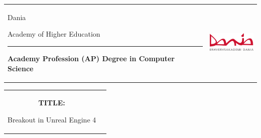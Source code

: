 \thispagestyle{empty}
\begin{titlepage}
\fontsize{11pt}{13pt}\selectfont
\begin{nopagebreak}
{\samepage 
\begin{tabular}{lr}
\parbox{14.5cm}{
  {\LARGE Dania}

  {\small Academy of Higher Education}
  \vspace{-0.3cm}\\
\hrule
\vspace{0.2cm}
  {\bf Academy Profession (AP) Degree in Computer Science}
 }   & \hspace{-2.8cm} {  \includegraphics[width=23mm]{pictures/dania}}
\end{tabular}
  

\begin{tabular}{cc}
\parbox{8cm}{
\hspace{2cm}
\begin{description}

\item {\bf TITLE:} 

Breakout in Unreal Engine 4

\end{description}

\parbox{8cm}{

}}
\end{tabular}}
\end{nopagebreak}
\end{titlepage}
